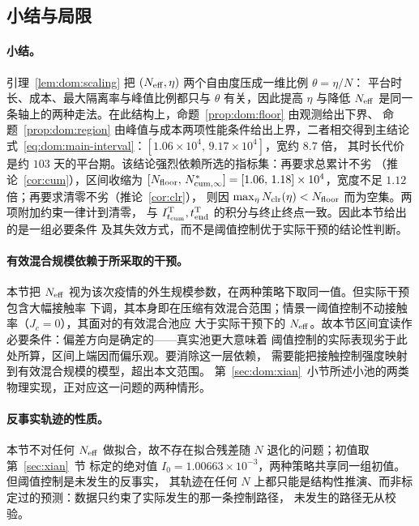 \documentclass[lang=cn,a4paper,newtx]{elegantpaper}
\numberwithin{equation}{section}
\theoremstyle{plain}
\newcommand{\Itcum}{I_{t_{\mathrm{cum}}}}
\begin{document}
\subsection{小结与局限}
\label{sec:dom:limits}

\paragraph{小结。}
引理~\ref{lem:dom:scaling} 把 $(N_{\rm eff},\eta)$ 两个自由度压成一维比例 $\theta=\eta/N$：
平台时长、成本、最大隔离率与峰值比例都只与 $\theta$ 有关，因此提高 $\eta$ 与降低 $N_{\rm eff}$
是同一条轴上的两种走法。在此结构上，命题~\ref{prop:dom:floor} 由观测给出下界、
命题~\ref{prop:dom:region} 由峰值与成本两项性能条件给出上界，二者相交得到主结论
式~\eqref{eq:dom:main-interval}：$[1.06\times10^{4},\,9.17\times10^{4}]$，宽约 $8.7$ 倍，
其时长代价是约 $103$ 天的平台期。该结论强烈依赖所选的指标集：再要求总累计不劣
（推论~\ref{cor:cum}），区间收缩为 $[N_{\rm floor},\,N_{\rm cum,\infty}^\ast]
=[1.06,\,1.18]\times10^{4}$，宽度不足 $1.12$ 倍；再要求清零不劣（推论~\ref{cor:clr}），
则因 $\max_\eta N_{\rm clr}(\eta)<N_{\rm floor}$ 而为空集。两项附加约束一律计到清零，
与 $\Itcum^{\rm T},t_{\rm end}^{\rm T}$ 的积分与终止终点一致。因此本节给出的是一组必要条件
及其失效方式，而不是阈值控制优于实际干预的结论性判断。

\paragraph{有效混合规模依赖于所采取的干预。}
本节把 $N_{\rm eff}$ 视为该次疫情的外生规模参数，在两种策略下取同一值。但实际干预包含大幅接触率
下调，其本身即在压缩有效混合范围；情景一阈值控制不动接触率（$J_c=0$），其面对的有效混合池应
大于实际干预下的 $N_{\rm eff}$。故本节区间宜读作必要条件：偏差方向是确定的——真实池更大意味着
阈值控制的实际表现劣于此处所算，区间上端因而偏乐观。要消除这一层依赖，
需要能把接触控制强度映射到有效混合规模的模型，超出本文范围。
第~\ref{sec:dom:xian}~小节所述小池的两类物理实现，正对应这一问题的两种情形。

\paragraph{反事实轨迹的性质。}
本节不对任何 $N_{\rm eff}$ 做拟合，故不存在拟合残差随 $N$ 退化的问题；初值取第~\ref{sec:xian}~节
标定的绝对值 $I_0=1.00663\times10^{-3}$，两种策略共享同一组初值。但阈值控制是未发生的反事实，
其轨迹在任何 $N$ 上都只能是结构性推演、而非标定过的预测：数据只约束了实际发生的那一条控制路径，
未发生的路径无从校验。
\end{document}
